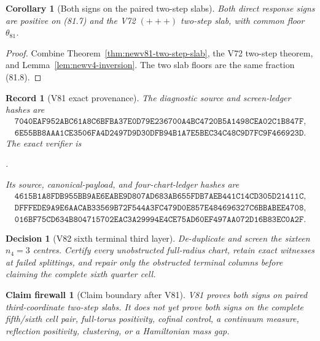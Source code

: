 \documentclass[11pt,oneside]{article}
\newtheorem{corollary}[theorem]{Corollary}
\newtheorem{firewall}[theorem]{Claim firewall}
\newtheorem{record}[theorem]{Record}
\newtheorem{decision}[theorem]{Decision}
\theoremstyle{definition}
\theoremstyle{remark}
\begin{document}
\begin{corollary}[Both signs on the paired two-step slabs]
\label{cor:newv81-paired-slabs}
Both direct response signs are positive on (81.7) and the V72
\((+++)\) two-step slab, with common floor \(\theta_{81}\).
\end{corollary}

\begin{proof}
Combine Theorem~\ref{thm:newv81-two-step-slab}, the V72 two-step
theorem, and Lemma~\ref{lem:newv4-inversion}.  The two slab floors
are the same fraction (81.8).
\end{proof}

\begin{record}[V81 exact provenance]
\label{rec:newv81-provenance}
The diagnostic source and screen-ledger hashes are
\[
\begin{gathered}
\texttt{7040EAF952ABC61A8C6BFBA37E0D79E236700A4BC4720B5A1498CEA02C1B847F},\\
\texttt{6E55BB8AAA1CE3506FA4D2497D9D30DFB94B1A7E5BEC34C48C9D7FC9F466923D}.
\end{gathered}                                          \tag{81.9}
\]
The exact verifier is
\begin{center}\footnotesize
{}.
\end{center}
Its source, canonical-payload, and four-chart-ledger hashes are
\[
\begin{gathered}
\texttt{4615B1A8FDB955BB9AE6EABE9D807AD683AB655FDB7AEB441C14CD305D21411C},\\
\texttt{DFFFEDE9A9E6AACAB33569B72F544A3FC479D0E857E484696327C6BBABEE4708},\\
\texttt{016BF75CD634B804715702EAC3A29994E4CE75AD60EF497AA072D16B83EC0A2F}.
\end{gathered}                                          \tag{81.10}
\]
\end{record}

\begin{decision}[V82 sixth terminal third layer]
\label{dec:newv81-next}
De-duplicate and screen the sixteen \(n_4=3\) centres.  Certify every
unobstructed full-radius chart, retain exact witnesses at failed
splittings, and repair only the obstructed terminal columns before
claiming the complete sixth quarter cell.
\end{decision}

\begin{firewall}[Claim boundary after V81]
\label{fire:newv81-final}
V81 proves both signs on paired third-coordinate two-step slabs.  It
does not yet prove both signs on the complete fifth/sixth cell pair,
full-torus positivity, cofinal control, a continuum measure,
reflection positivity, clustering, or a Hamiltonian mass gap.
\end{firewall}
\end{document}
